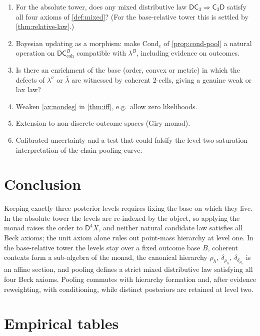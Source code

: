 \documentclass[11pt]{article}
\theoremstyle{definition}
\theoremstyle{remark}
\newcommand{\D}{\mathsf{D}}
\newcommand{\Cond}{\mathrm{Cond}}
\newcommand{\C}{\mathsf{C}}
\newcommand{\lb}{\bar\lambda}
\newcommand{\ls}{\lambda^{\sigma}}
\begin{document}
\begin{enumerate}[leftmargin=*]
\item For the absolute tower, does any mixed distributive law $\D\C_3\Rightarrow\C_3\D$ satisfy
  all four axioms of \cref{def:mixed}? (For the base-relative tower this is settled by
  \cref{thm:relative-law}.)
\item Bayesian updating as a morphism: make $\Cond_e$ of \cref{prop:cond-pool} a natural operation
  on $\D\C^B_{\mathrm{coh}}$ compatible with $\lambda^B$, including evidence on outcomes.
\item Is there an enrichment of the base (order, convex or metric) in which the defects of $\ls$ or
  $\lb$ are witnessed by coherent 2-cells, giving a genuine weak or lax law?
\item Weaken \cref{ax:nondeg} in \cref{thm:iff}, e.g.\ allow zero likelihoods.
\item Extension to non-discrete outcome spaces (Giry monad).
\item Calibrated uncertainty and a test that could falsify the level-two saturation interpretation of
  the chain-pooling curve.
\end{enumerate}

\section{Conclusion}

Keeping exactly three posterior levels requires fixing the base on which they live. In the
absolute tower the levels are re-indexed by the object, so applying the monad raises the order to
$\D^4X$, and neither natural candidate law satisfies all Beck axioms; the unit axiom alone rules out
point-mass hierarchy at level one. In the base-relative tower the levels stay over a fixed outcome
base $B$, coherent contexts form a sub-algebra of the monad, the canonical hierarchy
$\rho_h,\ \delta_{\rho_h},\ \delta_{\delta_{\rho_h}}$ is an affine section, and pooling defines a strict
mixed distributive law satisfying all four Beck axioms. Pooling commutes with hierarchy formation
and, after evidence reweighting, with conditioning, while distinct posteriors are retained at level
two.

\appendix

\section{Empirical tables}\label{app:empirical}
\end{document}
